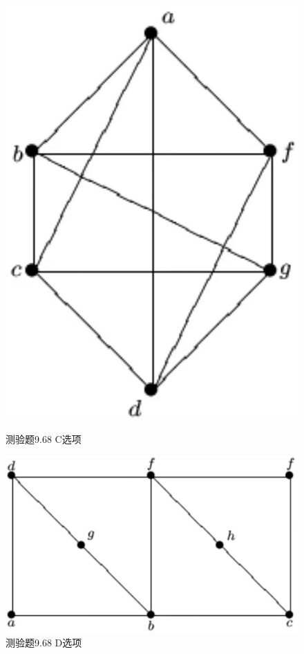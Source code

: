 \documentclass[UTF8, heading=true]{ctexart}
\begin{document}
\begin{figure}[H]
  \centering
  \begin{minipage}[t]{0.2\textwidth}
      \centering
      \includegraphics[width=1\textwidth]{9.67_3.jpg} %
      \vspace{-0.3cm}
      \caption{测验题9.68 C选项}
  \end{minipage}
  \hspace{0.22\textwidth} %
  \begin{minipage}[t]{0.35\textwidth}
      \centering
      \includegraphics[width=1\textwidth]{9.67_4.jpg} %
      \vspace{-0.3cm}
      \caption{测验题9.68 D选项}
\end{minipage}
\end{figure}
\end{document}

